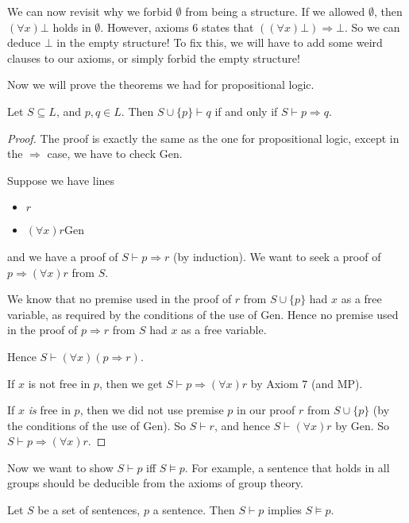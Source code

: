 \documentclass[a4paper]{article}
\begin{document}
We can now revisit why we forbid $\emptyset$ from being a structure. If we allowed $\emptyset$, then $(\forall x)\bot$ holds in $\emptyset$. However, axioms 6 states that $((\forall x)\bot )\Rightarrow \bot$. So we can deduce $\bot$ in the empty structure! To fix this, we will have to add some weird clauses to our axioms, or simply forbid the empty structure!

Now we will prove the theorems we had for propositional logic.
\begin{prop}
  Let $S\subseteq L$, and $p, q\in L$. Then $S\cup \{p\}\vdash q$ if and only if $S\vdash p\Rightarrow q$.
\end{prop}

\begin{proof}
  The proof is exactly the same as the one for propositional logic, except in the $\Rightarrow $ case, we have to check Gen.

  Suppose we have lines
  \begin{itemize}
    \item $r$
    \item $(\forall x) r$\hfill Gen
  \end{itemize}
  and we have a proof of $S\vdash p\Rightarrow r$ (by induction). We want to seek a proof of $p\Rightarrow (\forall x)r$ from $S$.

  We know that no premise used in the proof of $r$ from $S\cup \{p\}$ had $x$ as a free variable, as required by the conditions of the use of Gen. Hence no premise used in the proof of $p\Rightarrow r$ from $S$ had $x$ as a free variable.

  Hence $S\vdash (\forall x)(p\Rightarrow r)$.

  If $x$ is not free in $p$, then we get $S\vdash p\Rightarrow (\forall x)r$ by Axiom 7 (and MP).

  If $x$ \emph{is} free in $p$, then we did not use premise $p$ in our proof $r$ from $S\cup \{p\}$ (by the conditions of the use of Gen). So $S\vdash r$, and hence $S\vdash (\forall x)r$ by Gen. So $S\vdash p\Rightarrow (\forall x)r$.
\end{proof}

Now we want to show $S\vdash p$ iff $S\models p$. For example, a sentence that holds in all groups should be deducible from the axioms of group theory.

\begin{prop}
  Let $S$ be a set of sentences, $p$ a sentence. Then $S\vdash p$ implies $S\models p$.
\end{prop}
\end{document}
